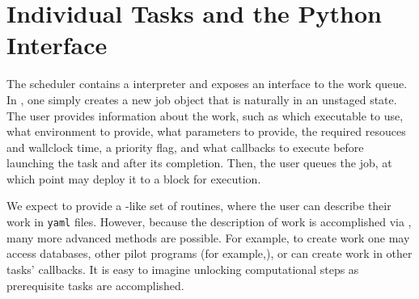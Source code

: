 \section{Individual Tasks and the Python Interface}
\label{sec:python}

The scheduler contains a \python interpreter and exposes an interface to the work queue.
In \python, one simply creates a new job object that is naturally in an unstaged state.
The user provides information about the work, such as which executable to use, what environment to provide, what parameters to provide, the required resouces and wallclock time, a priority flag, and what callbacks to execute before launching the task and after its completion.
Then, the user queues the job, at which point \jmscheduler may deploy it to a block for execution.

We expect to provide a \metaq-like set of routines, where the user can describe their work in \texttt{yaml}\cite{YAML} files.
However, because the description of work is accomplished via \python, many more advanced methods are possible.
For example, to create work one may access databases, other pilot programs (for example,\cite{taxi}), or can create work in other tasks' callbacks.
It is easy to imagine unlocking computational steps as prerequisite tasks are accomplished.
